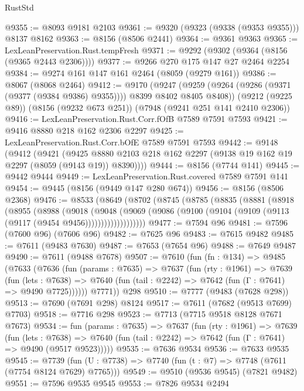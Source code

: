 \begin{lexlean}{RustStd}
\begin{coremodule}
@9355 := @8093 @9181 @2103
@9361 := @9320 (@9323 (@9338 (@9353 @9355))) @8137 @8162
@9363 := @8156 (@8506 @2441)
@9364 := @9361 @9363
@9365 := LexLeanPreservation.Rust.tempFresh
@9371 := @9292 (@9302 (@9364 (@8156 (@9365 @2443 @2306))))
@9377 := @9266 @270 @175 @147 @27 @2464 @2254
@9384 := @9274 @161 @147 @161 @2464 (@8059 (@9279 @161))
@9386 := @8067 (@8068 @2464)
@9412 := @9170
    (@9247 (@9259 (@9264 (@9286 (@9371 (@9377 (@9384 @9386) @9355)))) @8399 @8402 @8405 @8408))
    (@9212 (@9225 @89))
    (@8156 (@9232 @673 @251))
    (@7948 (@9241 @251 @141 @2410 @2306))
@9416 := LexLeanPreservation.Rust.Corr.fOfB @7589 @7591 @7593
@9421 := @9416 @8880 @218 @162 @2306 @2297
@9425 := LexLeanPreservation.Rust.Corr.bOfE @7589 @7591 @7593
@9442 := @9148
    (@9412
      (@9421
        (@9425 @8880 @2103 @218 @162 @2297 (@9138 @19 @162 @19 @2297 (@8059 (@9143 @19)) @8390))))
@9444 := @8156 (@7744 @141)
@9445 := @9442 @9444
@9449 := LexLeanPreservation.Rust.covered @7589 @7591 @141
@9454 := @9445 (@8156 (@9449 @147 @280 @674))
@9456 := @8156 (@8506 @2368)
@9476 := @8533
    (@8649
      (@8702
        (@8745
          (@8785
            (@8835
              (@8881
                (@8918
                  (@8955
                    (@8988
                      (@9018
                        (@9048
                          (@9069
                            (@9086
                              (@9100 (@9104 (@9109 (@9113 (@9117 (@9454 @9456)))))))))))))))))))
@9477 := @7594 @96
@9481 := @7596 (@7600 @96) (@7606 @96)
@9482 := @7625 @96
@9483 := @7615 @9482
@9485 := @7611 (@9483 @7630)
@9487 := @7653 (@7654 @96)
@9488 := @7649 @9487
@9490 := @7611 (@9488 @7678)
@9507 := @7610
    (fun (fn : @134) =>
    @9485
      (@7633
        (@7636
          (fun (params : @7635) =>
          @7637
            (fun (rty : @1961) =>
            @7639
              (fun (lets : @7638) =>
              @7640 (fun (tail : @2242) => @7642 (fun (Γ : @7641) => @9490 @7725))))))
        @7771))
    @298
@9510 := @7777 (@9483 (@7628 @298))
@9513 := @7690 (@7691 @298) @8124
@9517 := @7611 (@7682 (@9513 @7699) @7703)
@9518 := @7716 @298
@9523 := @7713 (@7715 @9518 @8128 @7671 @7673)
@9534 := fun (params : @7635) =>
  @7637
    (fun (rty : @1961) =>
    @7639
      (fun (lets : @7638) =>
      @7640 (fun (tail : @2242) => @7642 (fun (Γ : @7641) => @9490 (@9517 @9523)))))
@9535 := @7636 @9534
@9536 := @7633 @9535
@9545 := @7739 (fun (U : @7738) => @7740 (fun (t : @7) => @7748 (@7611 (@7754 @8124 @7629) @7765)))
@9549 := @9510 (@9536 @9545) (@7821 @9482)
@9551 := @7596 @9535 @9545
@9553 := @7826 @9534 @2494

\end{coremodule}
\end{lexlean}
